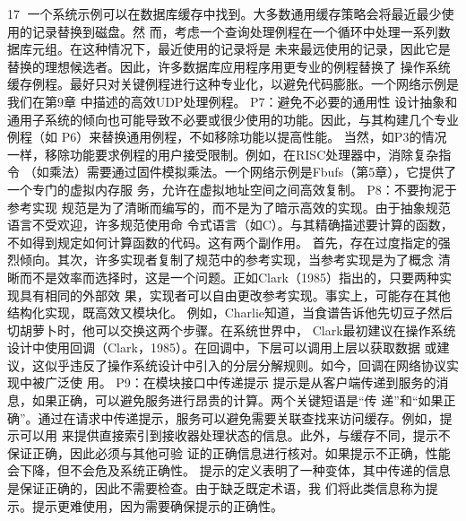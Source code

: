                                                    17
一个系统示例可以在数据库缓存中找到。大多数通用缓存策略会将最近最少使用的记录替换到磁盘。然
而，考虑一个查询处理例程在一个循环中处理一系列数据库元组。在这种情况下，最近使用的记录将是
未来最远使用的记录，因此它是替换的理想候选者。因此，许多数据库应用程序用更专业的例程替换了
操作系统缓存例程。最好只对关键例程进行这种专业化，以避免代码膨胀。一个网络示例是我们在第9章
中描述的高效UDP处理例程。
P7：避免不必要的通用性
设计抽象和通用子系统的倾向也可能导致不必要或很少使用的功能。因此，与其构建几个专业例程（如
P6）来替换通用例程，不如移除功能以提高性能。
当然，如P3的情况一样，移除功能要求例程的用户接受限制。例如，在RISC处理器中，消除复杂指令
（如乘法）需要通过固件模拟乘法。一个网络示例是Fbufs（第5章），它提供了一个专门的虚拟内存服
务，允许在虚拟地址空间之间高效复制。
P8：不要拘泥于参考实现
规范是为了清晰而编写的，而不是为了暗示高效的实现。由于抽象规范语言不受欢迎，许多规范使用命
令式语言（如C）。与其精确描述要计算的函数，不如得到规定如何计算函数的代码。这有两个副作用。
首先，存在过度指定的强烈倾向。其次，许多实现者复制了规范中的参考实现，当参考实现是为了概念
清晰而不是效率而选择时，这是一个问题。正如Clark（1985）指出的，只要两种实现具有相同的外部效
果，实现者可以自由更改参考实现。事实上，可能存在其他结构化实现，既高效又模块化。
例如，Charlie知道，当食谱告诉他先切豆子然后切胡萝卜时，他可以交换这两个步骤。在系统世界中，
Clark最初建议在操作系统设计中使用回调（Clark，1985）。在回调中，下层可以调用上层以获取数据
或建议，这似乎违反了操作系统设计中引入的分层分解规则。如今，回调在网络协议实现中被广泛使
用。
P9：在模块接口中传递提示
提示是从客户端传递到服务的消息，如果正确，可以避免服务进行昂贵的计算。两个关键短语是“传
递”和“如果正确”。通过在请求中传递提示，服务可以避免需要关联查找来访问缓存。例如，提示可以用
来提供直接索引到接收器处理状态的信息。此外，与缓存不同，提示不保证正确，因此必须与其他可验
证的正确信息进行核对。如果提示不正确，性能会下降，但不会危及系统正确性。
提示的定义表明了一种变体，其中传递的信息是保证正确的，因此不需要检查。由于缺乏既定术语，我
们将此类信息称为提示。提示更难使用，因为需要确保提示的正确性。


